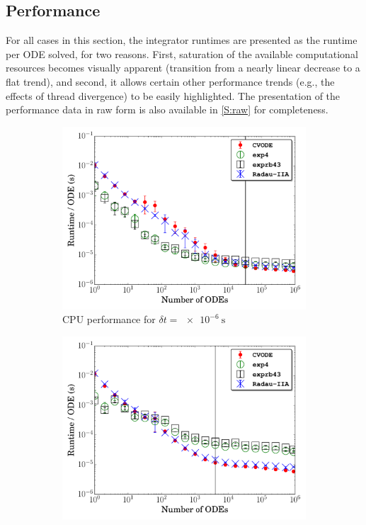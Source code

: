\documentclass[preprint,review,11pt]{elsarticle}
\begin{document}
\subsection{Performance}
\label{S:perf}

For all cases in this section, the integrator runtimes are presented as the runtime per ODE solved, for two reasons.
First, saturation of the available computational resources becomes visually apparent (transition from a nearly linear decrease to a flat trend), and second, it allows certain other performance trends (e.g., the effects of thread divergence) to be easily highlighted.
The presentation of the performance data in raw form is also available in \ref{S:raw} for completeness.

\begin{figure}[htb]
  \centering
  \begin{subfigure}{0.49\textwidth}
      \includegraphics[width=\linewidth]{H2_1e-06_cpu.pdf}
      \caption{CPU performance for $\delta t = \SI{e-6}{\second}$}
      \label{F:h2_cpu_perf_small}
  \end{subfigure}
  \begin{subfigure}{0.49\textwidth}
      \includegraphics[width=\linewidth]{H2_1e-04_cpu.pdf}

\end{subfigure}
\end{figure}
\end{document}
